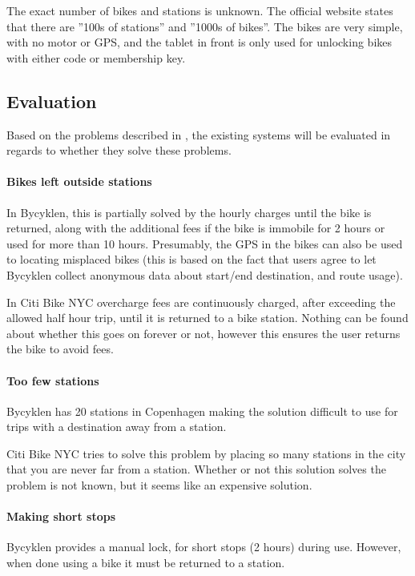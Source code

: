 The exact number of bikes and stations is unknown.
The official website states that there are ''100s of stations'' and ''1000s of bikes''\cite{nyc_citibike}.
The bikes are very simple, with no motor or GPS, and the tablet in front is only used for unlocking bikes with either code or membership key.

\subsection{Evaluation}
Based on the problems described in , the existing systems will be evaluated in regards to whether they solve these problems.

\paragraph{Bikes left outside stations}
In Bycyklen, this is partially solved by the hourly charges until the bike is returned, along with the additional fees if the bike is immobile for 2 hours or used for more than 10 hours.
Presumably, the GPS in the bikes can also be used to locating misplaced bikes (this is based on the fact that users agree to let Bycyklen collect anonymous data about start/end destination, and route usage).

In Citi Bike NYC overcharge fees are continuously charged, after exceeding the allowed half hour trip, until it is returned to a bike station.
Nothing can be found about whether this goes on forever or not, however this ensures the user returns the bike to avoid fees.

\paragraph{Too few stations}
Bycyklen has 20 stations in Copenhagen making the solution difficult to use for trips with a destination away from a station. 

Citi Bike NYC tries to solve this problem by placing so many stations in the city that you are never far from a station.
Whether or not this solution solves the problem is not known, but it seems like an expensive solution.

\paragraph{Making short stops}
Bycyklen provides a manual lock, for short stops (2 hours) during use.
However, when done using a bike it must be returned to a station.

